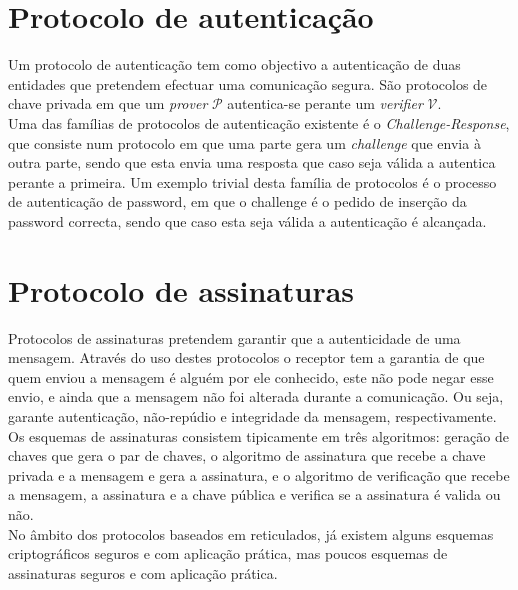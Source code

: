 \section{Protocolo de autenticação}
Um protocolo de autenticação tem como objectivo a autenticação de duas entidades que pretendem efectuar uma comunicação segura. São protocolos de chave privada em que um \textit{prover} $\mathcal{P}$ autentica-se perante um \textit{verifier} $\mathcal{V}$.\\
Uma das famílias de protocolos de autenticação existente é o \textit{Challenge-Response}, que consiste num protocolo em que uma parte gera um \textit{challenge} que envia à outra parte, sendo que esta envia uma resposta que caso seja válida a autentica perante a primeira. Um exemplo trivial desta família de protocolos é o processo de autenticação de password, em que o challenge é o pedido de inserção da password correcta, sendo que caso esta seja válida a autenticação é alcançada.\\

\section{Protocolo de assinaturas}
Protocolos de assinaturas pretendem garantir que a autenticidade de uma mensagem. Através do uso destes protocolos o receptor tem a garantia de que quem enviou a mensagem é alguém por ele conhecido, este não pode negar esse envio, e ainda que a mensagem não foi alterada durante a comunicação. Ou seja, garante autenticação, não-repúdio e integridade da mensagem, respectivamente.\\
Os esquemas de assinaturas consistem tipicamente em três algoritmos: geração de chaves que gera o par de chaves, o algoritmo de assinatura que recebe a chave privada e a mensagem e gera a assinatura, e o algoritmo de verificação que recebe a mensagem, a assinatura e a chave pública e verifica se a assinatura é valida ou não.\\

No âmbito dos protocolos baseados em reticulados, já existem alguns esquemas criptográficos seguros e com aplicação prática, mas poucos esquemas de assinaturas seguros e com aplicação prática.
